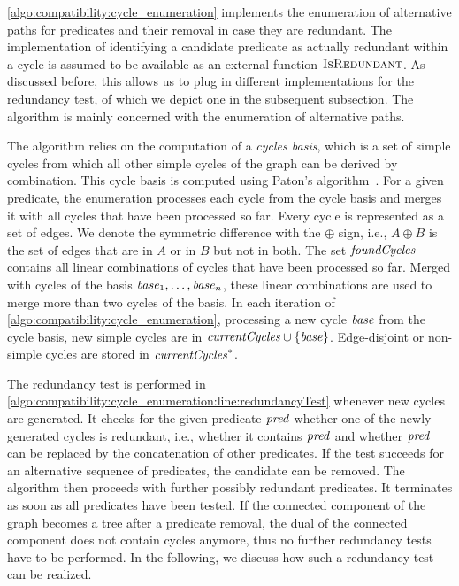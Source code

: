 \autoref{algo:compatibility:cycle_enumeration} implements the enumeration of alternative paths for predicates and their removal in case they are redundant.
The implementation of identifying a candidate predicate as actually redundant within a cycle is assumed to be available as an external function $\textsc{IsRedundant}$.
As discussed before, this allows us to plug in different implementations for the redundancy test, of which we depict one in the subsequent subsection.
The algorithm is mainly concerned with the enumeration of alternative paths.

The algorithm relies on the computation of a \emph{cycles basis}, which is a set of simple cycles from which all other simple cycles of the graph can be derived by combination.
This cycle basis is computed using Paton's algorithm~\cite{paton1969algorithm}.
For a given predicate, the enumeration processes each cycle from the cycle basis and merges it with all cycles that have been processed so far. 
Every cycle is represented as a set of edges.
We denote the symmetric difference with the $\oplus$ sign, i.e., $A \oplus B$ is the set of edges that are in $A$ or in $B$ but not in both.
The set $\mathit{foundCycles}$ contains all linear combinations of cycles that have been processed so far.
Merged with cycles of the basis $\mathit{base}_1, \dots, \mathit{base}_n$, these linear combinations are used to merge more than two cycles of the basis.
In each iteration of \autoref{algo:compatibility:cycle_enumeration}, processing a new cycle $\mathit{base}$ from the cycle basis, new simple cycles are in $\mathit{currentCycles} \cup \{ \mathit{base} \}$. Edge-disjoint or non-simple cycles are stored in $\mathit{currentCycles}^*$.

The redundancy test is performed in \autoref{algo:compatibility:cycle_enumeration:line:redundancyTest} whenever new cycles are generated.
It checks for the given predicate $\mathit{pred}$ whether one of the newly generated cycles is redundant, i.e., whether it contains $\mathit{pred}$ and whether $\mathit{pred}$ can be replaced by the concatenation of other predicates.
If the test succeeds for an alternative sequence of predicates, the candidate can be removed.
The algorithm then proceeds with further possibly redundant predicates.
It terminates as soon as all predicates have been tested.
If the connected component of the graph becomes a tree after a predicate removal, the dual of the connected component does not contain cycles anymore, thus no further redundancy tests have to be performed.
In the following, we discuss how such a redundancy test can be realized.


